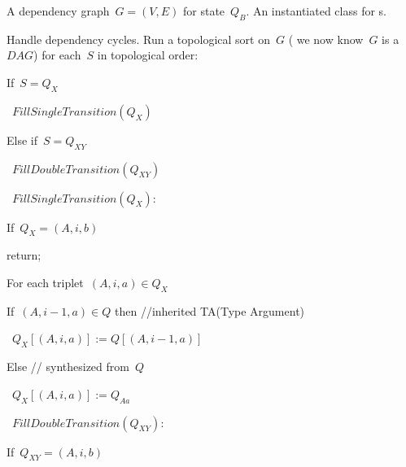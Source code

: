 \begin{algorithmic}
  \begin{description}
    \STATE [{Input:}] A dependency graph~$G=(V,E)$ for state~$Q_{B}$.
    \STATE [{Output:}] An instantiated class for s.
    \STATE [{Method:}]~
    \begin{enumerate}
      \STATE Handle dependency cycles.
      \STATE Run a topological sort on~$G$ ( we now know~$G$ is a~$DAG$)
      \STATE for each~$S$ in topological order:
            \begin{enumerate}
              \STATE If~$S=Q_{X}$
                    \begin{enumerate}
                      \STATE~$FillSingleTransition(Q_{X})$
                    \end{enumerate}
              \STATE Else if~$S=Q_{XY}$
                    \begin{enumerate}
                      \STATE~$FillDoubleTransition(Q_{XY})$
                    \end{enumerate}
            \end{enumerate}
    \end{enumerate}
    \begin{description}
      \STATE [{Function}]~$FillSingleTransition(Q_{X}):$
      \begin{enumerate}
        \STATE If~$Q_{X}=(A,i,b)$
              \begin{enumerate}
                \STATE return;
              \end{enumerate}
        \STATE For each triplet~$(A,i,a)∈Q_{X}$
              \begin{enumerate}
                \STATE If~$(A,i-1,a)∈Q$ then //inherited TA(Type Argument)
                      \begin{enumerate}
                        \STATE~$Q_{X}[(A,i,a)]:=Q[(A,i-1,a)]$
                      \end{enumerate}
                \STATE Else // synthesized from~$Q$
                      \begin{enumerate}
                        \STATE~$Q_{X}[(A,i,a)]:=Q_{Aa}$
                      \end{enumerate}
              \end{enumerate}
      \end{enumerate}
      \STATE [{Function}]~$FillDoubleTransition(Q_{XY})$:
      \begin{enumerate}
        \STATE If~$Q_{XY}=(A,i,b)$

\end{enumerate}
\end{description}
\end{description}
\end{algorithmic}

